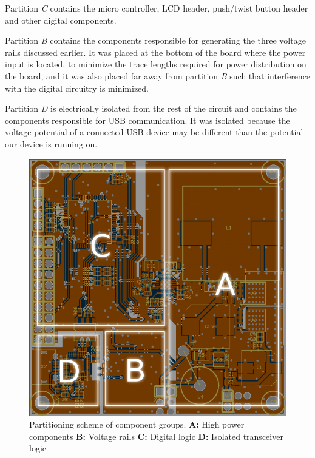 Partition \emph{C} contains the micro  controller, LCD header, push/twist button
header and other digital components.

Partition \emph{B} contains the components  responsible for generating the three
voltage rails discussed earlier. It was placed at  the bottom of the board where
the  power input is located, to minimize the trace lengths  required  for  power
distribution on  the  board,  and  it  was  also  placed far away from partition
\emph{B}  such  that  interference  with  the  digital  circuitry  is minimized.

Partition \emph{D} is  electrically  isolated  from  the rest of the circuit and
contains  the  components responsible for USB  communication.  It  was  isolated
because the  voltage  potential  of a connected USB device may be different than
the potential our device is running on.

\begin{figure}[th!]
    \centering
    \includegraphics[width=.45\linewidth]{images/pcb/partitioning.png}
    \caption{Partitioning scheme of component groups.
        \textbf{A:} High power components
        \textbf{B:} Voltage rails
        \textbf{C:} Digital logic
        \textbf{D:} Isolated transceiver logic
    }
    \label{fig:pcb:partitioning}
\end{figure}

